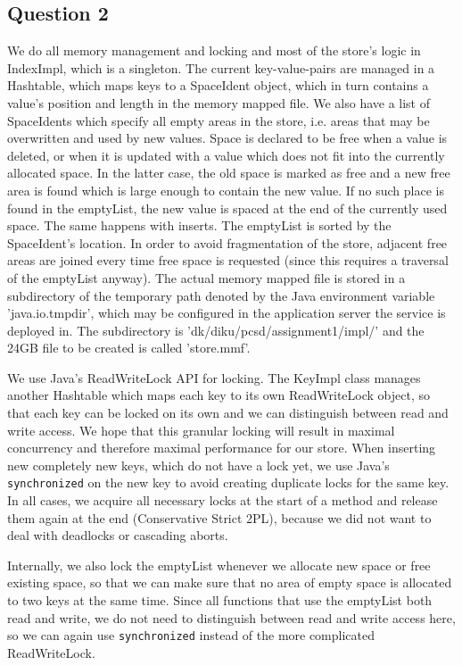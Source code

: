 \documentclass[12pt,a4paper]{article}
\begin{document}
\subsection*{Question 2}
\label{sec:pq2}

We do all memory management and locking and most of the store's logic in IndexImpl, which is a singleton. The current key-value-pairs are managed in a Hashtable, which maps keys to a SpaceIdent object, which in turn contains a value's position and length in the memory mapped file. We also have a list of SpaceIdents which specify all empty areas in the store, i.e. areas that may be overwritten and used by new values. Space is declared to be free when a value is deleted, or when it is updated with a value which does not fit into the currently allocated space. In the latter case, the old space is marked as free and a new free area is found which is large enough to contain the new value. If no such place is found in the emptyList, the new value is spaced at the end of the currently used space. The same happens with inserts. The emptyList is sorted by the SpaceIdent's location. In order to avoid fragmentation of the store, adjacent free areas are joined every time free space is requested (since this requires a traversal of the emptyList anyway). The actual memory mapped file is stored in a subdirectory of the temporary path denoted by the Java environment variable 'java.io.tmpdir', which may be configured in the application server the service is deployed in. The subdirectory is 'dk/diku/pcsd/assignment1/impl/' and the 24GB file to be created is called 'store.mmf'.

We use Java's ReadWriteLock API for locking. The KeyImpl class manages another Hashtable which maps each key to its own ReadWriteLock object, so that each key can be locked on its own and we can distinguish between read and write access. We hope that this granular locking will result in maximal concurrency and therefore maximal performance for our store. When inserting new completely new keys, which do not have a lock yet, we use Java's \texttt{synchronized} on the new key to avoid creating duplicate locks for the same key. In all cases, we acquire all necessary locks at the start of a method and release them again at the end (Conservative Strict 2PL), because we did not want to deal with deadlocks or cascading aborts. 

Internally, we also lock the emptyList whenever we allocate new space or free existing space, so that we can make sure that no area of empty space is allocated to two keys at the same time. Since all functions that use the emptyList both read and write, we do not need to distinguish between read and write access here, so we can again use \texttt{synchronized} instead of the more complicated ReadWriteLock.
\end{document}
